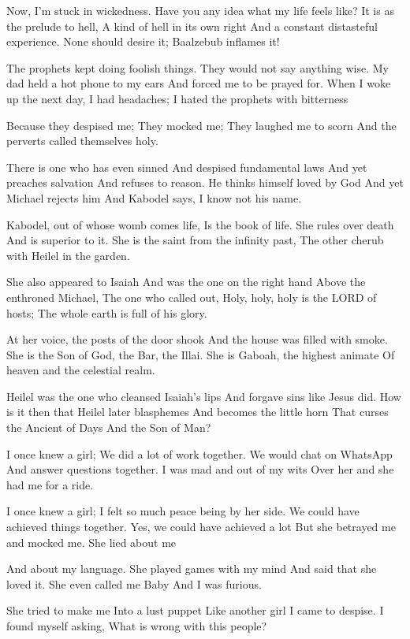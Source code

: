 \documentclass[
]{book}
\begin{document}
Now, I'm stuck in wickedness.
Have you any idea what my life feels like?
It is as the prelude to hell,
A kind of hell in its own right
And a constant distasteful experience.
None should desire it;
Baalzebub inflames it!

The prophets kept doing foolish things.
They would not say anything wise.
My dad held a hot phone to my ears
And forced me to be prayed for.
When I woke up the next day,
I had headaches;
I hated the prophets with bitterness

Because they despised me;
They mocked me;
They laughed me to scorn
And the perverts called themselves holy.

There is one who has even sinned
And despised fundamental laws
And yet preaches salvation
And refuses to reason.
He thinks himself loved by God
And yet Michael rejects him
And Kabodel says, I know not his name.

Kabodel, out of whose womb comes life,
Is the book of life.
She rules over death
And is superior to it.
She is the saint from the infinity past,
The other cherub with Heilel in the garden.

She also appeared to Isaiah
And was the one on the right hand
Above the enthroned Michael,
The one who called out,
Holy, holy, holy is the LORD of hosts;
The whole earth is full of his glory.

At her voice, the posts of the door shook
And the house was filled with smoke.
She is the Son of God, the Bar, the Illai.
She is Gaboah, the highest animate
Of heaven and the celestial realm.

Heilel was the one who cleansed Isaiah's lips
And forgave sins like Jesus did.
How is it then that Heilel later blasphemes
And becomes the little horn
That curses the Ancient of Days
And the Son of Man?

I once knew a girl;
We did a lot of work together.
We would chat on WhatsApp
And answer questions together.
I was mad and out of my wits
Over her and she had me for a ride.

I once knew a girl;
I felt so much peace being by her side.
We could have achieved things together.
Yes, we could have achieved a lot
But she betrayed me and mocked me.
She lied about me

And about my language.
She played games with my mind
And said that she loved it.
She even called me Baby
And I was furious.

She tried to make me
Into a lust puppet
Like another girl I came to despise.
I found myself asking,
What is wrong with this people?
\end{document}
